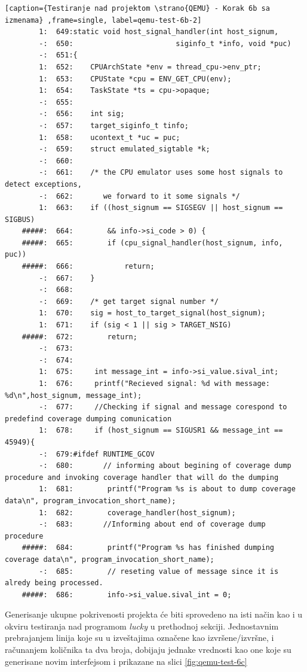 \documentclass[12pt,oneside]{memoir}
\newcommand{\strano}[1]{\textit{#1}}
\begin{document}
\begin{lstlisting}[caption={Testiranje nad projektom \strano{QEMU} - Korak 6b sa izmenama} ,frame=single, label=qemu-test-6b-2]
        1:  649:static void host_signal_handler(int host_signum,
        -:  650:                        siginfo_t *info, void *puc)
        -:  651:{
        1:  652:    CPUArchState *env = thread_cpu->env_ptr;
        1:  653:    CPUState *cpu = ENV_GET_CPU(env);
        1:  654:    TaskState *ts = cpu->opaque;
        -:  655:
        -:  656:    int sig;
        -:  657:    target_siginfo_t tinfo;
        1:  658:    ucontext_t *uc = puc;
        -:  659:    struct emulated_sigtable *k;
        -:  660:
        -:  661:    /* the CPU emulator uses some host signals to detect exceptions,
        -:  662:       we forward to it some signals */
        1:  663:    if ((host_signum == SIGSEGV || host_signum == SIGBUS)
    #####:  664:        && info->si_code > 0) {
    #####:  665:        if (cpu_signal_handler(host_signum, info, puc))
    #####:  666:            return;
        -:  667:    }
        -:  668:
        -:  669:    /* get target signal number */
        1:  670:    sig = host_to_target_signal(host_signum);
        1:  671:    if (sig < 1 || sig > TARGET_NSIG)
    #####:  672:        return;
        -:  673:
        -:  674:
        1:  675:     int message_int = info->si_value.sival_int;
        1:  676:     printf("Recieved signal: %d with message: %d\n",host_signum, message_int);
        -:  677:     //Checking if signal and message corespond to predefind coverage dumping comunication
        1:  678:     if (host_signum == SIGUSR1 && message_int == 45949){
        -:  679:#ifdef RUNTIME_GCOV
        -:  680:       // informing about begining of coverage dump procedure and invoking coverage handler that will do the dumping
        1:  681:        printf("Program %s is about to dump coverage data\n", program_invocation_short_name);
        1:  682:        coverage_handler(host_signum);
        -:  683:       //Informing about end of coverage dump procedure
    #####:  684:        printf("Program %s has finished dumping coverage data\n", program_invocation_short_name);
        -:  685:        // reseting value of message since it is alredy being processed.
    #####:  686:        info->si_value.sival_int = 0;
\end{lstlisting}

Generisanje ukupne pokrivenosti projekta će biti sprovedeno na isti način kao i u okviru testiranja nad programom \strano{lucky} u prethodnoj sekciji. Jednostavnim prebrajanjem linija koje su u izveštajima označene kao izvršene/izvršne, i računanjem količnika ta dva broja, dobijaju jednake vrednosti kao one koje su generisane novim interfejsom i prikazane na slici \ref{fig:qemu-test-6c}
\end{document}
